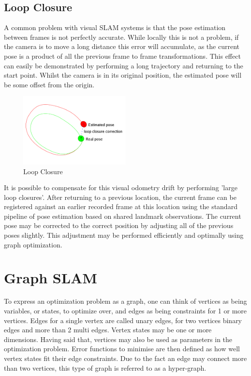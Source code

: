 \subsection{Loop Closure}
\label{subsec:loop_closure}

A common problem with visual SLAM systems is that the pose estimation between frames is not perfectly accurate.  While locally this is not a problem, if the camera is to move a long distance this error will accumulate, as the current pose is a product of all the previous frame to frame transformations.  This effect can easily be demonstrated by performing a long trajectory and returning to the start point.  Whilst the camera is in its original position, the estimated pose will be some offset from the origin.

\begin{figure}[h!]
  \centering
    \includegraphics[width=0.5\textwidth]{chapters/images/loop-closure}
  \caption{Loop Closure}
\end{figure}

It is possible to compensate for this visual odometry drift by performing 'large loop closures'. After returning to a previous location, the current frame can be registered against an earlier recorded frame at this location using the standard pipeline of pose estimation based on shared landmark observations.  The current pose may be corrected to the correct position by adjusting all of the previous poses slightly.  This adjustment may be performed efficiently and optimally using graph optimization.

\section{Graph SLAM}
\label{subsec:graph_slam}

To express an optimization problem as a graph, one can think of vertices as being variables, or states, to optimize over, and edges as being constraints for 1 or more vertices.  Edges for a single vertex are called unary edges, for two vertices binary edges and more than 2 multi edges.  Vertex states may be one or more dimensions.  Having said that, vertices may also be used as parameters in the optimization problem.  Error functions to minimise are then defined as how well vertex states fit their edge constraints.  Due to the fact an edge may connect more than two vertices, this type of graph is referred to as a hyper-graph.

